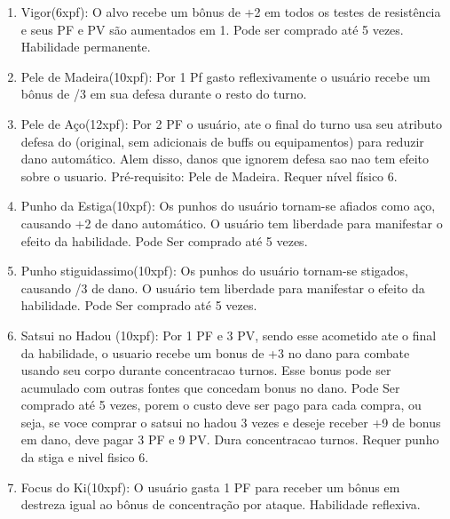 \begin{enumerate}

		\item Vigor(6xpf): O alvo recebe um bônus de +2 em todos os testes de resistência e seus PF e PV são aumentados em 1. Pode ser comprado até 5 vezes. Habilidade permanente.
  
  	\item Pele de Madeira(10xpf): Por 1 Pf gasto reflexivamente o usuário recebe um bônus de /3 em sua defesa durante o resto do turno. 
  	
  	\item Pele de Aço(12xpf): Por 2 PF o usuário, ate o final do turno usa seu atributo defesa do (original, sem adicionais de buffs ou equipamentos) para reduzir dano automático. Alem disso, danos que ignorem defesa sao nao tem efeito sobre o usuario. Pré-requisito: Pele de Madeira. Requer nível físico 6.

  
  	\item Punho da Estiga(10xpf): Os punhos do usuário tornam-se afiados como aço, causando +2 de dano automático. O usuário tem liberdade para manifestar o efeito da habilidade. Pode Ser comprado até 5 vezes.

  	\item Punho stiguidassimo(10xpf): Os punhos do usuário tornam-se stigados, causando /3 de dano. O usuário tem liberdade para manifestar o efeito da habilidade. Pode Ser comprado até 5 vezes.

  	\item Satsui no Hadou (10xpf): Por 1 PF e 3 PV, sendo esse acometido ate o final da habilidade, o usuario recebe um bonus de +3 no dano para combate usando seu corpo durante concentracao turnos. Esse bonus pode ser acumulado com outras fontes que concedam bonus no dano. Pode Ser comprado até 5 vezes, porem o custo deve ser pago para cada compra, ou seja, se voce comprar o satsui no hadou 3 vezes e deseje receber +9 de bonus em dano, deve pagar 3 PF e 9 PV. Dura concentracao turnos. Requer punho da stiga e nivel fisico 6.

  	\item Focus do Ki(10xpf): O usuário gasta 1 PF para receber um bônus em destreza igual ao bônus de concentração por ataque. Habilidade reflexiva.


\end{enumerate}
